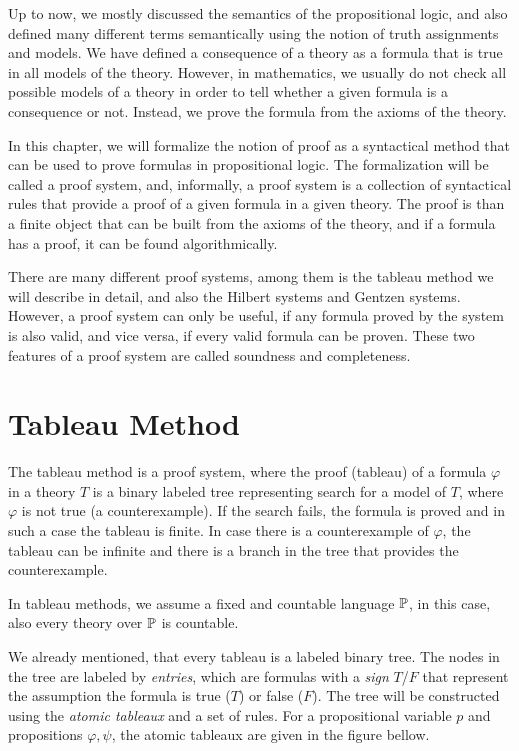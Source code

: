 Up to now, we mostly discussed the semantics of the propositional logic, and also defined many different terms semantically using the notion of truth assignments and models. We have defined a consequence of a theory as a formula that is true in all models of the theory. However, in mathematics, we usually do not check all possible models of a theory in order to tell whether a given formula is a consequence or not. Instead, we prove the formula from the axioms of the theory. 

In this chapter, we will formalize the notion of proof as a syntactical method that can be used to prove formulas in propositional logic. The formalization will be called a proof system, and, informally, a proof system is a collection of syntactical rules that provide a proof of a given formula in a given theory. The proof is than a finite object that can be built from the axioms of the theory, and if a formula has a proof, it can be found algorithmically. 

There are many different proof systems, among them is the tableau method we will describe in detail, and also the Hilbert systems and Gentzen systems. However, a proof system can only be useful, if any formula proved by the system is also valid, and vice versa, if every valid formula can be proven. These two features of a proof system are called soundness and completeness. 

\section{Tableau Method}

The tableau method is a proof system, where the proof (tableau) of a formula $\varphi$ in a theory $T$ is a binary labeled tree representing search for a model of $T$, where $\varphi$ is not true (a counterexample). If the search fails, the formula is proved and in such a case the tableau is finite. In case there is a counterexample of $\varphi$, the tableau can be infinite and there is a branch in the tree that provides the counterexample.

In tableau methods, we assume a fixed and countable language $\mathbb{P}$, in this case, also every theory over $\mathbb{P}$ is countable.

We already mentioned, that every tableau is a labeled binary tree. The nodes in the tree are labeled by \emph{entries}, which are formulas with a \emph{sign} $T$/$F$ that represent the assumption the formula is true ($T$) or false ($F$). The tree will be constructed using the \emph{atomic tableaux} and a set of rules. For a propositional variable $p$ and propositions $\varphi, \psi$, the atomic tableaux are given in the figure bellow.

